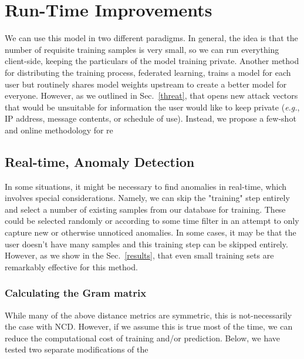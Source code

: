 \documentclass{article}
\begin{document}
\section{Run-Time Improvements}
\label{improvements}
We can use this model in two different paradigms. In general, the idea is that the number of requisite training samples is very small, so we can run everything client-side, keeping the particulars of the model training private. Another method for distributing the training process, federated learning, trains a model for each user but routinely shares model weights upstream to create a better model for everyone. However, as we outlined in Sec.~\ref{threat}, that opens new attack vectors that would be unsuitable for information the user would like to keep private (\textit{e.g.}, IP address, message contents, or schedule of use). Instead, we propose a few-shot and online methodology for re


\subsection{Real-time, Anomaly Detection}
In some situations, it might be necessary to find anomalies in real-time, which involves special considerations. Namely, we can skip the "training" step entirely and select a number of existing samples from our database for training. These could be selected randomly or according to some time filter in an attempt to only capture new or otherwise unnoticed anomalies. In some cases, it may be that the user doesn't have many samples and this training step can be skipped entirely. However, as we show in the Sec.~\ref{results}, that even small training sets are remarkably effective for this method.




\subsubsection{Calculating the Gram matrix}
\label{symmetry}
While many of the above distance metrics are symmetric, this is not-necessarily the case with NCD. However, if we assume this is true most of the time, we can reduce the computational cost of training and/or prediction. Below, we have tested two separate modifications of the 
\end{document}
